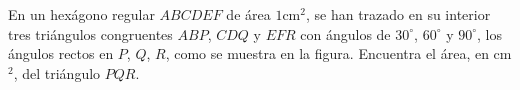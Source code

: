 En un hexágono regular $ABCDEF$ de área $1$cm$^2$, se han trazado en su interior tres triángulos congruentes $ABP$, $CDQ$ y $EFR$ con ángulos de $30^\circ$, $60^\circ$ y $90^\circ$, los ángulos rectos en $P$, $Q$, $R$, como se muestra en la figura. Encuentra el área, en cm$^2$, del triángulo $PQR$.